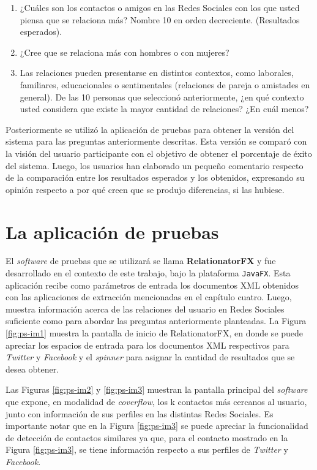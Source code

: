 \begin{enumerate}
\item ¿Cuáles son los contactos o amigos en las Redes Sociales con los que usted piensa que se relaciona más? Nombre 10 en orden decreciente. (Resultados esperados).
\item ¿Cree que se relaciona más con hombres o con mujeres?
\item Las relaciones pueden presentarse en distintos contextos, como laborales, familiares, educacionales o sentimentales (relaciones de pareja o amistades en general). De las 10 personas que seleccionó anteriormente, ¿en qué contexto usted considera que existe la mayor cantidad de relaciones? ¿En cuál menos?
\end{enumerate}

Posteriormente se utilizó la aplicación de pruebas para obtener la versión del sistema para las preguntas anteriormente descritas. Esta versión se comparó con la visión del usuario participante con el objetivo de obtener el porcentaje de éxito del sistema. Luego, los usuarios han elaborado un pequeño comentario respecto de la comparación entre los resultados esperados y los obtenidos, expresando su opinión respecto a por qué creen que se produjo diferencias, si las hubiese.


\section{La aplicación de pruebas}

El \textit{software} de pruebas que se utilizará se llama \textbf{RelationatorFX} y fue desarrollado en el contexto de este trabajo, bajo la plataforma \texttt{JavaFX}.
Esta aplicación recibe como parámetros de entrada los documentos XML obtenidos con las aplicaciones de extracción mencionadas en el capítulo cuatro. Luego, muestra información acerca de las relaciones del usuario en Redes Sociales suficiente como para abordar las preguntas anteriormente planteadas. La Figura \ref{fig:ps-im1} muestra la pantalla de inicio de RelationatorFX, en donde se puede apreciar los espacios de entrada para los documentos XML respectivos para \textit{Twitter} y \textit{Facebook} y el \textit{spinner} para asignar la cantidad de resultados que se desea obtener.

Las Figuras \ref{fig:ps-im2} y \ref{fig:ps-im3} muestran la pantalla principal del \textit{software} que expone, en modalidad de \textit{coverflow}, los k contactos más cercanos al usuario, junto con información de sus perfiles en las distintas Redes Sociales. Es importante notar que en la Figura \ref{fig:ps-im3} se puede apreciar la funcionalidad de detección de contactos similares ya que, para el contacto mostrado en la Figura \ref{fig:ps-im3}, se tiene información respecto a sus perfiles de \textit{Twitter} y \textit{Facebook}.

